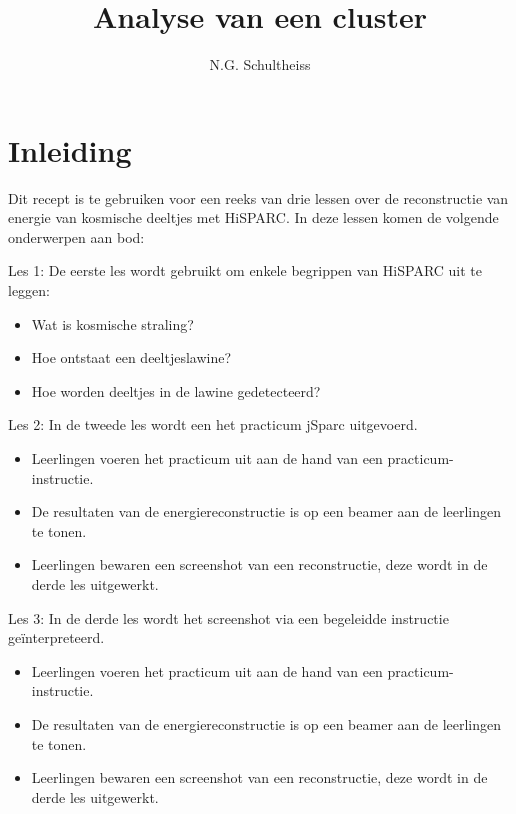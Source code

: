 

\title{Analyse van een cluster}
\author{N.G. Schultheiss}



\maketitle

\section{Inleiding}

Dit recept is te gebruiken voor een reeks van drie lessen over de reconstructie van energie van kosmische deeltjes met HiSPARC. In deze lessen komen de volgende onderwerpen aan bod:

Les 1: De eerste les wordt gebruikt om enkele begrippen van HiSPARC uit te leggen:

\begin{itemize}
\item Wat is kosmische straling?
\item Hoe ontstaat een deeltjeslawine?
\item Hoe worden deeltjes in de lawine gedetecteerd?
\end{itemize}

Les 2: In de tweede les wordt een het practicum jSparc uitgevoerd.
\begin{itemize}
\item Leerlingen voeren het practicum uit aan de hand van een practicum-instructie.
\item De resultaten van de energiereconstructie is op een beamer aan de leerlingen te tonen.
\item Leerlingen bewaren een screenshot van een reconstructie, deze wordt in de derde les uitgewerkt.
\end{itemize}

Les 3: In de derde les wordt het screenshot via een begeleidde instructie ge\"interpreteerd.
\begin{itemize}
\item Leerlingen voeren het practicum uit aan de hand van een practicum-instructie.
\item De resultaten van de energiereconstructie is op een beamer aan de leerlingen te tonen.
\item Leerlingen bewaren een screenshot van een reconstructie, deze wordt in de derde les uitgewerkt.
\end{itemize}

